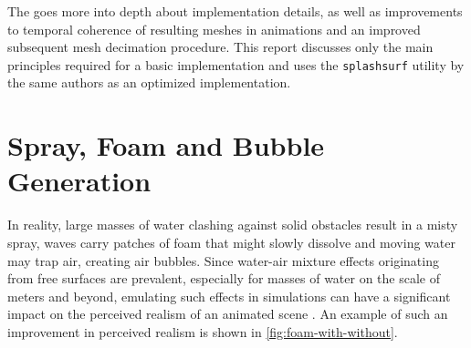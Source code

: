 \documentclass[oneside, a4paper]{book}
\begin{document}
  The \autocite[original paper]{laplacian-surf-reconst} goes more into depth about implementation details, as well as improvements to temporal coherence of resulting meshes in animations and an improved subsequent mesh decimation procedure. This report discusses only the main principles required for a basic implementation and uses the \texttt{splashsurf} utility by the same authors as an optimized implementation.

  \section{Spray, Foam and Bubble Generation}
  In reality, large masses of water clashing against solid obstacles result in a misty spray, waves carry patches of foam that might slowly dissolve and moving water may trap air, creating air bubbles. Since water-air mixture effects originating from free surfaces are prevalent, especially for masses of water on the scale of meters and beyond, emulating such effects in simulations can have a significant impact on the perceived realism of an animated scene \autocite{spray-foam-bubbles}. An example of such an improvement in perceived realism is shown in \autoref{fig:foam-with-without}.
\end{document}
